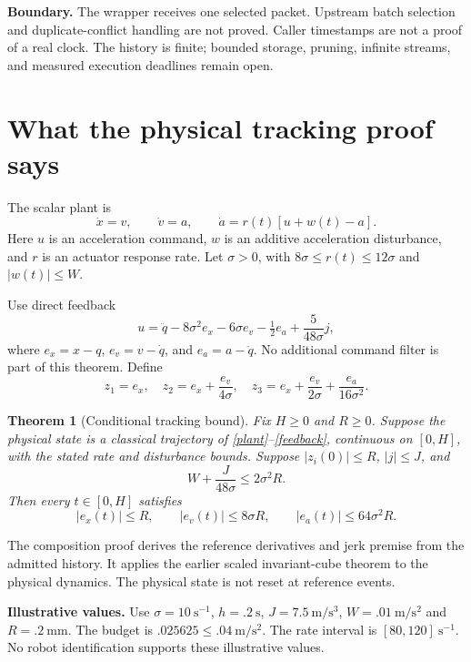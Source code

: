 \documentclass[11pt,letterpaper]{article}
\newtheorem{theorem}{Theorem}
\begin{document}
\textbf{Boundary.} The wrapper receives one selected packet. Upstream batch selection and duplicate-conflict handling are not proved. Caller timestamps are not a proof of a real clock. The history is finite; bounded storage, pruning, infinite streams, and measured execution deadlines remain open.

\newpage
\section{What the physical tracking proof says}
The scalar plant is
\begin{equation}\label{plant}
\dot x=v,\qquad \dot v=a,\qquad \dot a=r(t)[u+w(t)-a].
\end{equation}
Here $u$ is an acceleration command, $w$ is an additive acceleration disturbance, and $r$ is an actuator response rate. Let $\sigma>0$, with $8\sigma\leq r(t)\leq12\sigma$ and $|w(t)|\leq W$.

Use direct feedback
\begin{equation}\label{feedback}
u=\ddot q-8\sigma^2e_x-6\sigma e_v-\tfrac12e_a+\frac{5}{48\sigma}j,
\end{equation}
where $e_x=x-q$, $e_v=v-\dot q$, and $e_a=a-\ddot q$. No additional command filter is part of this theorem. Define
\[
z_1=e_x,\quad z_2=e_x+\frac{e_v}{4\sigma},\quad
z_3=e_x+\frac{e_v}{2\sigma}+\frac{e_a}{16\sigma^2}.
\]
\begin{theorem}[Conditional tracking bound]\label{tracking}
Fix $H\geq0$ and $R\geq0$. Suppose the physical state is a classical trajectory of \eqref{plant}--\eqref{feedback}, continuous on $[0,H]$, with the stated rate and disturbance bounds. Suppose $|z_i(0)|\leq R$, $|j|\leq J$, and
\begin{equation}\label{budget}
W+\frac{J}{48\sigma}\leq2\sigma^2R.
\end{equation}
Then every $t\in[0,H]$ satisfies
\[
|e_x(t)|\leq R,\qquad |e_v(t)|\leq8\sigma R,\qquad
|e_a(t)|\leq64\sigma^2R.
\]
\end{theorem}
The composition proof derives the reference derivatives and jerk premise from the admitted history. It applies the earlier scaled invariant-cube theorem to the physical dynamics. The physical state is not reset at reference events.

\textbf{Illustrative values.} Use $\sigma=10\ \mathrm{s}^{-1}$, $h=.2\ \mathrm{s}$, $J=7.5\ \mathrm{m/s^3}$, $W=.01\ \mathrm{m/s^2}$ and $R=.2\ \mathrm{mm}$. The budget is $.025625\leq.04\ \mathrm{m/s^2}$. The rate interval is $[80,120]\ \mathrm{s}^{-1}$. No robot identification supports these illustrative values.
\end{document}
